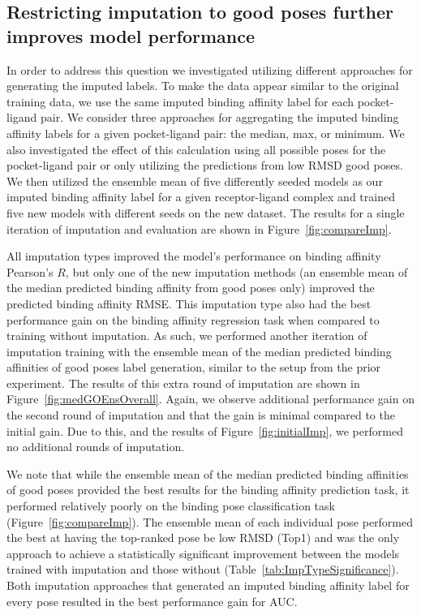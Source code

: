 \documentclass[journal=jmcmar,manuscript=article]{achemso}
\begin{document}
\subsection{Restricting imputation to good poses further improves model performance}
In order to address this question we investigated utilizing different approaches for generating the imputed labels.
To make the data appear similar to the original training data, we use the same imputed binding affinity label for each pocket-ligand pair.
We consider three approaches for aggregating the imputed binding affinity labels for a given pocket-ligand pair: the median, max, or minimum.
We also investigated the effect of this calculation using all possible poses for the pocket-ligand pair or only utilizing the predictions from low RMSD good poses.
We then utilized the ensemble mean of five differently seeded models as our imputed binding affinity label for a given receptor-ligand complex and trained five new models with different seeds on the new dataset.
The results for a single iteration of imputation and evaluation are shown in Figure~\ref{fig:compareImp}.

All imputation types improved the model's performance on binding affinity Pearson's $R$, but only one of the new imputation methods (an ensemble mean of the median predicted binding affinity from good poses only) improved the predicted binding affinity RMSE.
This imputation type also had the best performance gain on the binding affinity regression task when compared to training without imputation.
As such, we performed another iteration of imputation training with the ensemble mean of the median predicted binding affinities of good poses label generation, similar to the setup from the prior experiment.
The results of this extra round of imputation are shown in Figure~\ref{fig:medGOEnsOverall}.
Again, we observe additional performance gain on the second round of imputation and that the gain is minimal compared to the initial gain.
Due to this, and the results of Figure~\ref{fig:initialImp}, we performed no additional rounds of imputation.

We note that while the ensemble mean of the median predicted binding affinities of good poses provided the best results for the binding affinity prediction task, it performed relatively poorly on the binding pose classification task (Figure~\ref{fig:compareImp}).
The ensemble mean of each individual pose performed the best at having the top-ranked pose be low RMSD (Top1) and was the only approach to achieve a statistically significant improvement between the models trained with imputation and those without (Table~\ref{tab:ImpTypeSignificance}).
Both imputation approaches that generated an imputed binding affinity label for every pose resulted in the best performance gain for AUC.
\end{document}
